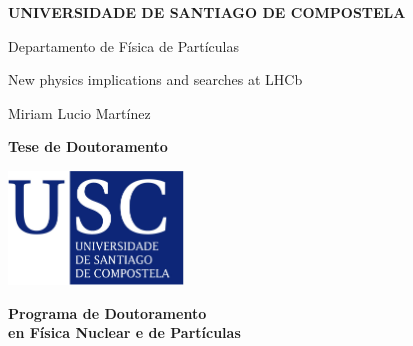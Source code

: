 \thispagestyle{empty}

\vspace{3cm}

\begin{center}
{\bf\normalsize UNIVERSIDADE DE SANTIAGO DE COMPOSTELA}
\end{center}
\vspace{0.10cm}
\begin{center}
\normalsize Departamento de F\'isica de Part\'iculas
\end{center}

\vspace{1.5cm}

{\bf\LARGE\boldmath
\begin{center}
New physics implications and searches at LHCb
\end{center}}
\vspace{0.5cm}
\begin{center}
\Large{Miriam Lucio Mart\'inez}\\%
\end{center}

\vspace{5cm}
\begin{center}
\bf{\LARGE Tese de Doutoramento}\\
\end{center}
\vspace{0.2cm}
\begin{center}
\includegraphics[width=0.35\textwidth]{figs/logo_ux.jpg}
\end{center}
\begin{center}
\vspace{0.2cm}
{\large \bf Programa de Doutoramento}\\\vspace{0.1cm}
{\large \bf en Física Nuclear e de Partículas}
\end{center}
